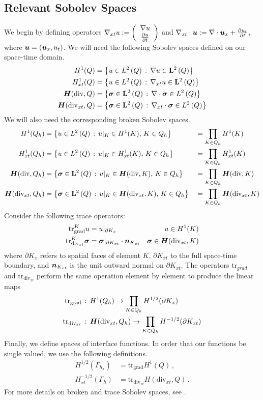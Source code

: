 \documentclass[Dissertation.tex]{subfiles}
\begin{document}
\subsection{Relevant Sobolev Spaces}
We begin by defining operators $\nabla_{xt} u:=\left( \begin{array}{c} \nabla u\\ \frac{\partial u}{\partial t}\\ \end{array} \right)$ and $\nabla_{xt}\cdot\boldsymbol u:=\nabla\cdot\boldsymbol u_x+\frac{\partial u_t}{\partial t}$, where $\boldsymbol u=(\boldsymbol u_x,u_t)$.
We will need the following Sobolev spaces defined on our space-time domain.
\begin{align*}
H^{1}(Q)&=\left\{ u\in L^2\left( Q \right)\,:\,\nabla u\in\mathbf{L}^2\left( Q \right) \right\}\\
H^1_{xt}(Q)&=\left\{ u\in L^2\left( Q \right)\,:\,\nabla_{xt} u\in\mathbf{L}^2\left( Q \right) \right\}\\
\mbox{\boldmath $H$}(\text{div},Q)&=\left\{ \boldsymbol\sigma\in\mathbf{L}^2\left( Q \right)\,:\,\nabla\cdot\boldsymbol\sigma\in L^2\left( Q \right) \right\}\\
\mbox{\boldmath $H$}(\text{div}_{xt},Q)&=\left\{ \boldsymbol\sigma\in\mathbf{L}^2\left( Q \right)\,:\,\nabla_{xt}\cdot\boldsymbol\sigma\in L^2\left( Q \right) \right\}\\
\end{align*}
We will also need the corresponding broken Sobolev spaces.
\begin{align*}
H^1(Q_h)&=\left\{ u\in L^2\left( Q \right)\,:\,u|_K\in H^{1}(K),\,K\in Q_h \right\}&&=\prod_{K\in Q_h}H^1(K)\\
H^1_{xt}(Q_h)&=\left\{ u\in L^2\left( Q \right)\,:\,u|_K\in H^1_{xt}(K),\,K\in Q_h \right\}&&=\prod_{K\in Q_h}H^1_{xt}(K)\\
\mbox{\boldmath $H$}(\text{div},Q_h)&=\left\{ \boldsymbol\sigma\in\mathbf{L}^2\left( Q \right)\,:\,u|_K\in\mbox{\boldmath $H$}(\text{div},K),\,K\in Q_h \right\}&&=\prod_{K\in Q_h}\mbox{\boldmath $H$}(\text{div},K)\\
\mbox{\boldmath $H$}(\text{div}_{xt},Q_h)&=\left\{ \boldsymbol\sigma\in\mathbf{L}^2\left( Q \right)\,:\,u|_K\in\mbox{\boldmath $H$}(\text{div}_{xt},K),\,K\in Q_h \right\}&&=\prod_{K\in Q_h}\mbox{\boldmath $H$}(\text{div}_{xt},K)
\end{align*}
Consider the following trace operators:
\begin{align*}
\text{tr}^K_\text{grad} u&=u|_{\partial K_x} & u\in H^1(K)\\
\text{tr}^K_{\text{div}_{xt}} \boldsymbol\sigma&=\boldsymbol\sigma|_{\partial K_{xt}}\cdot\boldsymbol n_{K_{xt}} & \boldsymbol\sigma\in \mbox{\boldmath $H$}(\text{div}_{xt},K)
\end{align*}
where $\partial K_x$ refers to spatial faces of element $K$, $\partial K_{xt}$ to the full space-time boundary, and $\boldsymbol n_{K_{xt}}$ is the unit outward normal on $\partial K_{xt}$.
The operators $\text{tr}_{grad}$ and $\text{tr}_{\text{div}_{xt}}$ perform the same operation element by element to produce the linear maps
\begin{align*}
\text{tr}_{\text{grad}}&\,:\,H^1(Q_h)\rightarrow\prod_{K\in Q_h}H^{1/2}(\partial K_x)\\
\text{tr}_{\text{div}_{xt}}&\,:\,\mbox{\boldmath $H$}(\text{div}_{xt},Q_h)\rightarrow\prod_{K\in Q_h}H^{-1/2}(\partial K_{xt})
\end{align*}
Finally, we define spaces of interface functions.
In order that our functions be single valued, we use the following definitions.
\begin{align*}
H^{1/2}(\Gamma_{h_x})&=\text{tr}_{\text{grad}}H^{1}(Q)\,,\\
H^{-1/2}_{xt}(\Gamma_h)&=\text{tr}_{\text{div}_{xt}}H(\text{div}_{xt},Q)\,.
\end{align*}
For more details on broken and trace Sobolev spaces, see \cite{BreakingSpaces}.
\end{document}
